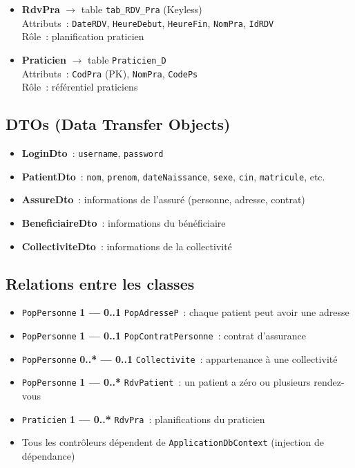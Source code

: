 \begin{itemize}
    \item \textbf{RdvPra} $\rightarrow$ table \texttt{tab\_RDV\_Pra} (Keyless)\\
    Attributs~: \texttt{DateRDV}, \texttt{HeureDebut}, \texttt{HeureFin}, \texttt{NomPra}, \texttt{IdRDV}\\
    Rôle~: planification praticien

    \item \textbf{Praticien} $\rightarrow$ table \texttt{Praticien\_D}\\
    Attributs~: \texttt{CodPra} (PK), \texttt{NomPra}, \texttt{CodePs}\\
    Rôle~: référentiel praticiens
\end{itemize}

\subsection{DTOs (Data Transfer Objects)}

\begin{itemize}
    \item \textbf{LoginDto}~: \texttt{username}, \texttt{password}
    \item \textbf{PatientDto}~: \texttt{nom}, \texttt{prenom}, \texttt{dateNaissance}, \texttt{sexe}, \texttt{cin}, \texttt{matricule}, etc.
    \item \textbf{AssureDto}~: informations de l'assuré (personne, adresse, contrat)
    \item \textbf{BeneficiaireDto}~: informations du bénéficiaire
    \item \textbf{CollectiviteDto}~: informations de la collectivité
\end{itemize}

\subsection{Relations entre les classes}

\begin{itemize}
    \item \texttt{PopPersonne} \textbf{1 --- 0..1} \texttt{PopAdresseP}~: chaque patient peut avoir une adresse
    \item \texttt{PopPersonne} \textbf{1 --- 0..1} \texttt{PopContratPersonne}~: contrat d'assurance
    \item \texttt{PopPersonne} \textbf{0..* --- 0..1} \texttt{Collectivite}~: appartenance à une collectivité
    \item \texttt{PopPersonne} \textbf{1 --- 0..*} \texttt{RdvPatient}~: un patient a zéro ou plusieurs rendez-vous
    \item \texttt{Praticien} \textbf{1 --- 0..*} \texttt{RdvPra}~: planifications du praticien
    \item Tous les contrôleurs dépendent de \texttt{ApplicationDbContext} (injection de dépendance)
\end{itemize}

